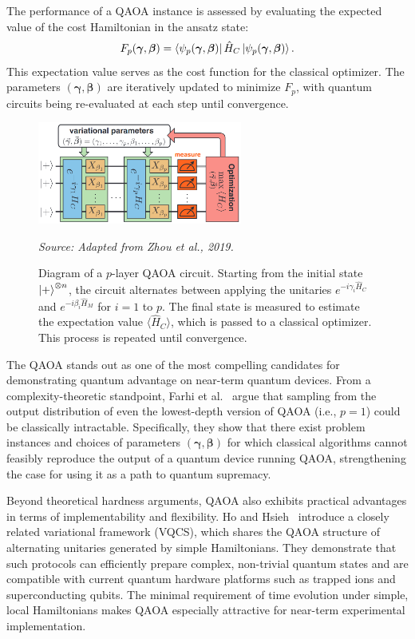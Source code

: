 The performance of a QAOA instance is assessed by evaluating the expected value of the cost
Hamiltonian in the ansatz state:
\begin{equation}
    F_p (\bm{\gamma}, \bm{\beta}) = \bra{\psi_p (\bm{\gamma}, \bm{\beta})} \hat{H}_C \ket{\psi_p (\bm{\gamma}, \bm{\beta})}.
    \label{eq:cost_function}
\end{equation}
This expectation value serves as the cost function for the classical optimizer. The parameters $(\bm{\gamma}, \bm{\beta})$ are iteratively updated to minimize $F_p$, with quantum circuits being re-evaluated at each step until convergence.

\begin{figure}[h]
    \centering
    \includegraphics[width=0.6\textwidth]{01-introduction/figs/qaoa.png}
    \caption{Diagram of a $p$-layer QAOA circuit. Starting from the initial state $\ket{+}^{\otimes n}$,
    the circuit alternates between applying the unitaries $e^{-i \gamma_i \hat{H}_C}$ and $e^{-i \beta_i \hat{H}_M}$
    for $i = 1$ to $p$. The final state is measured to estimate the expectation value $\langle \hat{H}_C \rangle$,
    which is passed to a classical optimizer. This process is repeated until convergence.}
    \vspace{0.3em}
    \small\textit{Source: Adapted from Zhou et al., 2019.~\cite{zhou_quantum_2020}}
    \label{fig:qaoa}
\end{figure}

The QAOA stands out as one of the most compelling candidates for demonstrating quantum advantage
on near-term quantum devices. From a complexity-theoretic standpoint, Farhi et al.~\cite{farhi_quantum_2019}
argue that sampling from the output distribution of even the lowest-depth version of QAOA (i.e., $p=1$)
could be classically intractable. Specifically, they show that there exist problem instances
and choices of parameters $(\bm{\gamma}, \bm{\beta})$ for which classical algorithms cannot
feasibly reproduce the output of a quantum device running QAOA, strengthening the case for
using it as a path to quantum supremacy.

Beyond theoretical hardness arguments, QAOA also exhibits practical advantages in terms of
implementability and flexibility. Ho and Hsieh~\cite{ho_efficient_2019} introduce a closely
related variational framework (VQCS), which shares the QAOA structure of alternating unitaries
generated by simple Hamiltonians. They demonstrate that such protocols can efficiently prepare
complex, non-trivial quantum states and are compatible with current quantum hardware platforms
such as trapped ions and superconducting qubits. The minimal requirement of time evolution
under simple, local Hamiltonians makes QAOA especially attractive for near-term experimental
implementation.

